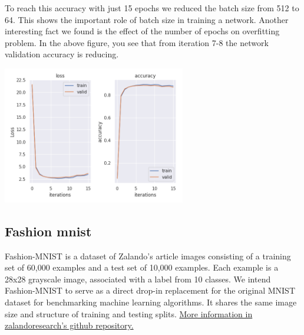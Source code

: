 \documentclass[10pt]{SelfArx} %
\begin{document}
	To reach this accuracy with just 15 epochs we reduced the batch size from 512 to 64. This shows the important role of batch size in training a network. Another interesting fact we found is the effect of the number of epochs on overfitting problem. In the above figure, you see that from iteration 7-8 the network validation accuracy is reducing.
	
	\begin{center}
		\includegraphics[width=1\linewidth,height=6cm]{img/mnist-plots2}
		\label{fmnist2}
	\end{center}
	
	
	\subsection{Fashion mnist}
	Fashion-MNIST is a dataset of Zalando's article images consisting of a training set of 60,000 examples and a test set of 10,000 examples. Each example is a 28x28 grayscale image, associated with a label from 10 classes. We intend Fashion-MNIST to serve as a direct drop-in replacement for the original MNIST dataset for benchmarking machine learning algorithms. It shares the same image size and structure of training and testing splits. \href{https://github.com/zalandoresearch/fashion-mnist}{More information in zalandoresearch's github repository.}
	
\end{document}

